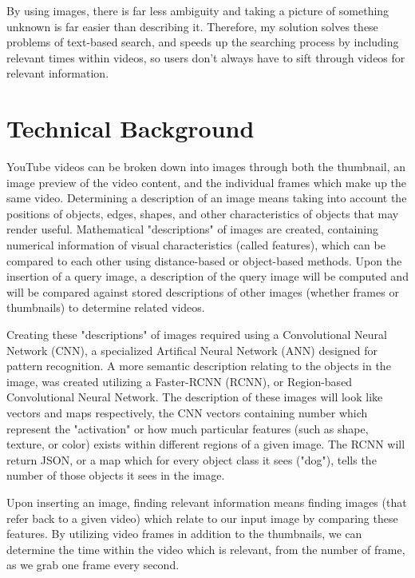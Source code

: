 \documentclass[10pt,twocolumn]{article}
\begin{document}
By using images, there is far less ambiguity and taking a picture of something unknown is far easier than describing it. Therefore, my solution solves these problems of text-based search, and speeds up the searching process by including relevant times within videos, so users don't always have to sift through videos for relevant information.

\section{Technical Background} 

YouTube videos can be broken down into images through both the thumbnail, an image preview of the video content, and the individual frames which make up the same video. Determining a description of an image means taking into account the positions of objects, edges, shapes, and other characteristics of objects that may render useful. Mathematical "descriptions" of images are created, containing numerical information of visual characteristics (called features), which can be compared to each other using distance-based or object-based methods. Upon the insertion of a query image, a description of the query image will be computed and will be compared against stored descriptions of other images (whether frames or thumbnails) to determine related videos.

Creating these "descriptions" of images required using a Convolutional Neural Network (CNN), a specialized Artifical Neural Network (ANN) designed for pattern recognition. A more semantic description relating to the objects in the image, was created utilizing a Faster-RCNN (RCNN), or Region-based Convolutional Neural Network. The description of these images will look like vectors and maps respectively, the CNN vectors containing number which represent the "activation" or how much particular features (such as shape, texture, or color) exists within different regions of a given image. The RCNN will return JSON, or a map which for every object class it sees ("dog"), tells the number of those objects it sees in the image.

Upon inserting an image, finding relevant information means finding images (that refer back to a given video) which relate to our input image by comparing these features. By utilizing video frames in addition to the thumbnails, we can determine the time within the video which is relevant, from the number of frame, as we grab one frame every second.
\end{document}
